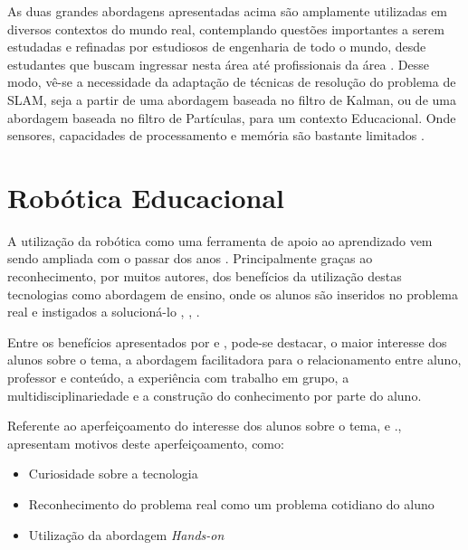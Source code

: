 As duas grandes abordagens apresentadas acima são amplamente utilizadas em diversos contextos do mundo real, contemplando questões importantes a serem estudadas e refinadas por estudiosos de engenharia de todo o mundo, desde estudantes que buscam ingressar nesta área até profissionais da área \cite{simpleRobotsIntroductionEng}. Desse modo, vê-se a necessidade da adaptação de técnicas de resolução do problema de SLAM, seja a partir de uma abordagem baseada no filtro de Kalman, ou de uma abordagem baseada no filtro de Partículas, para um contexto Educacional. Onde sensores, capacidades de processamento e memória são bastante limitados \cite{roboticEducationBasedLego}.

\section{Robótica Educacional} %
\label{sec:robótica_educacional}

A utilização da robótica como uma ferramenta de apoio ao aprendizado vem sendo ampliada com o passar dos anos \cite{teachingWithRoboticKit}. Principalmente graças ao reconhecimento, por muitos autores, dos benefícios da utilização destas tecnologias como abordagem de ensino, onde os alunos são inseridos no problema real e instigados a solucioná-lo \cite{teachingWithRoboticKit}, \cite{construcionismoPapert}, \cite{roboticaEducativaEnsinoMedio}.

Entre os benefícios apresentados por \cite{daMaquinaDeEnsinarAMaquinaDeAprender} e \cite{PCsEConstrucionismo}, pode-se destacar, o maior interesse dos alunos sobre o tema, a abordagem facilitadora para o relacionamento entre aluno, professor e conteúdo, a experiência com trabalho em grupo, a multidisciplinariedade e a construção do conhecimento por parte do aluno.

Referente ao aperfeiçoamento do interesse dos alunos sobre o tema, \cite{construcionismoPapert} e \cite{teachingWithRoboticKit}., apresentam motivos deste aperfeiçoamento, como:
\begin{itemize}
	\item Curiosidade sobre a tecnologia

	\item Reconhecimento do problema real como um problema cotidiano do aluno

	\item Utilização da abordagem \textit{Hands-on}
\end{itemize}


